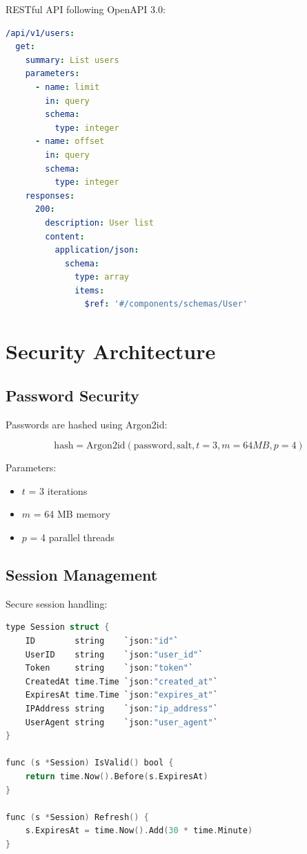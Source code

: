 \documentclass[11pt,a4paper]{article}
\begin{document}
RESTful API following OpenAPI 3.0:

\begin{lstlisting}[language=yaml]
/api/v1/users:
  get:
    summary: List users
    parameters:
      - name: limit
        in: query
        schema:
          type: integer
      - name: offset
        in: query
        schema:
          type: integer
    responses:
      200:
        description: User list
        content:
          application/json:
            schema:
              type: array
              items:
                $ref: '#/components/schemas/User'
\end{lstlisting}

\section{Security Architecture}

\subsection{Password Security}

Passwords are hashed using Argon2id:

\begin{equation}
    \text{hash} = \text{Argon2id}(\text{password}, \text{salt}, t=3, m=64MB, p=4)
\end{equation}

Parameters:
\begin{itemize}
    \item $t$ = 3 iterations
    \item $m$ = 64 MB memory
    \item $p$ = 4 parallel threads
\end{itemize}

\subsection{Session Management}

Secure session handling:

\begin{lstlisting}[language=C]
type Session struct {
    ID        string    `json:"id"`
    UserID    string    `json:"user_id"`
    Token     string    `json:"token"`
    CreatedAt time.Time `json:"created_at"`
    ExpiresAt time.Time `json:"expires_at"`
    IPAddress string    `json:"ip_address"`
    UserAgent string    `json:"user_agent"`
}

func (s *Session) IsValid() bool {
    return time.Now().Before(s.ExpiresAt)
}

func (s *Session) Refresh() {
    s.ExpiresAt = time.Now().Add(30 * time.Minute)
}
\end{lstlisting}
\end{document}
